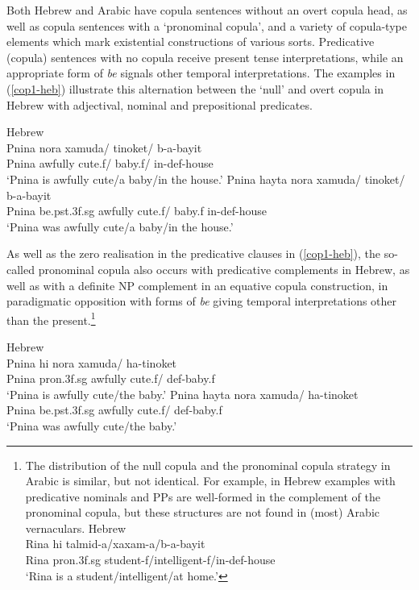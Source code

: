 \documentclass[output=paper,hidelinks]{langscibook}
\begin{document}
Both Hebrew and Arabic have copula sentences without an overt copula head, as well as copula sentences with a `pronominal copula', and a variety of copula-type elements which mark existential constructions of various sorts.
Predicative (copula) sentences with no  copula receive present tense interpretations, while an appropriate form of {\em be} signals other temporal interpretations.
The examples in (\ref{cop1-heb}) illustrate this alternation between  the `null' and overt copula in Hebrew with  adjectival, nominal and prepositional predicates.

\ea \label{cop1-heb}
\ea Hebrew \citep[227]{Falk04} \\
\gll Pnina nora xamuda/ tinoket/ b-a-bayit\\
Pnina awfully cute.{\sc f}/  baby.{\sc f}/ in-{\sc def}-house\\
\glt `Pnina is awfully cute/a baby/in the house.'
\ex \gll Pnina hayta nora xamuda/ tinoket/ b-a-bayit\\
Pnina be.{\sc pst.3f.sg} awfully cute.{\sc f}/  baby.{\sc f} in-{\sc def}-house\\
\glt `Pnina was awfully cute/a baby/in the house.'
\z\z



As well as the zero realisation in the predicative clauses in  (\ref{cop1-heb}), the  so-called pronominal copula also occurs with predicative complements in Hebrew, as well as  with a definite NP complement in an equative copula construction, in paradigmatic opposition  with forms of {\em be}  giving temporal interpretations other than the present.\footnote{The distribution of the null copula and the pronominal copula strategy in Arabic is similar, but not identical. For example, in Hebrew examples with predicative nominals and PPs are well-formed in the complement of the pronominal copula, but these structures are not found in (most) Arabic vernaculars.
\ea Hebrew \citep[296]{Sichel:1997} \\
\gll Rina hi talmid-a/xaxam-a/b-a-bayit\\
Rina  {\sc pron.3f.sg} student-{\sc f}/intelligent-{\sc f}/in-{\sc def}-house\\
\glt `Rina is a student/intelligent/at home.'
\z
}






\ea \label{cop2-heb}
\ea
Hebrew \citep[227]{Falk04}\\
\gll  Pnina hi nora xamuda/ ha-tinoket\\
Pnina {\sc pron.3f.sg} awfully cute.{\sc f}/  {\sc def}-baby.{\sc f}\\
\glt `Pnina is awfully cute/the baby.'
\ex \gll  Pnina hayta nora xamuda/ ha-tinoket\\
Pnina be.{\sc pst.3f.sg} awfully cute.{\sc f}/  {\sc def}-baby.{\sc f}\\
\glt `Pnina was awfully cute/the baby.'
\z\z
\end{document}
